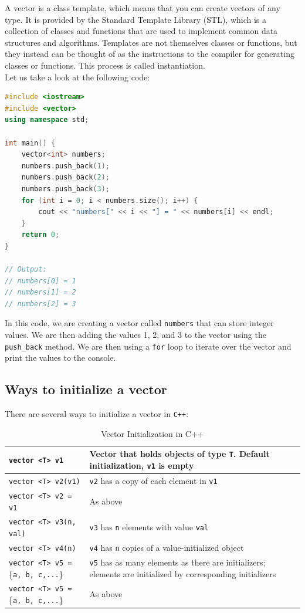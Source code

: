 A vector is a class template, which means that you can create vectors of any type. It is provided by the Standard Template
Library (STL), which is a collection of classes and functions that are used to implement common data structures and algorithms.
Templates are not themselves classes or functions, but they instead can be thought of as the instructions to the compiler for 
generating classes or functions. This process is called instantiation.\\

Let us take a look at the following code:

\begin{lstlisting}[language=C++]
#include <iostream>
#include <vector>
using namespace std;

int main() {
    vector<int> numbers;
    numbers.push_back(1);
    numbers.push_back(2);
    numbers.push_back(3);
    for (int i = 0; i < numbers.size(); i++) {
        cout << "numbers[" << i << "] = " << numbers[i] << endl;
    }
    return 0;
}

// Output:
// numbers[0] = 1
// numbers[1] = 2
// numbers[2] = 3
\end{lstlisting}

In this code, we are creating a vector called \texttt{numbers} that can store integer values. We are then adding the values
1, 2, and 3 to the vector using the \texttt{push\_back} method. We are then using a \texttt{for} loop to iterate over the
vector and print the values to the console.\\

\subsection{Ways to initialize a vector}

There are several ways to initialize a vector in \texttt{C++}:\\

\begin{table}[ht]
\centering
\begin{tabular}{|l|p{7cm}|}
\hline
\texttt{vector <T> v1} & Vector that holds objects of type \texttt{T}. Default initialization, \texttt{v1} is empty \\
\hline
\texttt{vector <T> v2(v1)} & \texttt{v2} has a copy of each element in \texttt{v1} \\
\hline
\texttt{vector <T> v2 = v1} & As above \\
\hline
\texttt{vector <T> v3(n, val)} & \texttt{v3} has \texttt{n} elements with value \texttt{val} \\
\hline
\texttt{vector <T> v4(n)} & \texttt{v4} has \texttt{n} copies of a value-initialized object \\
\hline
\texttt{vector <T> v5 = }\{\texttt{a, b, c,...}\} & \texttt{v5} has as many elements as there are initializers; elements are initialized by corresponding initializers \\
\hline
\texttt{vector <T> v5 = }\{\texttt{a, b, c,...}\} & As above \\
\hline
\end{tabular}
\caption{Vector Initialization in C++}
\label{tab:vector_init}
\end{table}

